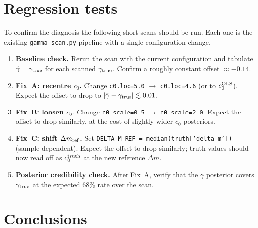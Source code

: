 \documentclass[11pt,a4paper]{article}
\newcommand{\dm}{\Delta m}
\newcommand{\dmref}{\dm_{\rm ref}}
\begin{document}
\section{Regression tests}

To confirm the diagnosis the following short scans should be run.  Each one
is the existing \texttt{gamma\_scan.py} pipeline with a single configuration
change.

\begin{enumerate}[noitemsep]
  \item \textbf{Baseline check.}  Rerun the scan with the current
        configuration and tabulate $\hat\gamma - \gamma_{\rm true}$ for each
        scanned $\gamma_{\rm true}$.  Confirm a roughly constant offset
        $\approx -0.14$.
  \item \textbf{Fix~A: recentre $c_0$.} Change \texttt{c0.loc=5.0} $\to$
        \texttt{c0.loc=4.6} (or to $c_0^{\rm OLS}$).  Expect the offset to
        drop to $|\hat\gamma - \gamma_{\rm true}| \lesssim 0.01$.
  \item \textbf{Fix~B: loosen $c_0$.} Change \texttt{c0.scale=0.5} $\to$
        \texttt{c0.scale=2.0}.  Expect the offset to drop similarly, at the
        cost of slightly wider $c_0$ posteriors.
  \item \textbf{Fix~C: shift $\dmref$.} Set \texttt{DELTA\_M\_REF =
        median(truth['delta\_m'])} (sample-dependent).  Expect the offset to
        drop similarly; truth values should now read off as
        $c_0^{\rm truth}$ at the new reference $\dm$.
  \item \textbf{Posterior credibility check.}  After Fix~A, verify that the
        $\gamma$ posterior covers $\gamma_{\rm true}$ at the expected 68\%
        rate over the scan.
\end{enumerate}

\section{Conclusions}
\end{document}
